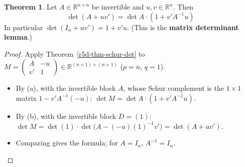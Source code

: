 \documentclass[12pt]{article}
\newcommand{\R}{\mathbb R}
\theoremstyle{definition}
\newtheorem{theorem}{Theorem}
\begin{document}
\begin{theorem}\label{r5d-thm-det-lemma}
Let \(A\in\R^{n\times n}\) be invertible and \(u,v\in\R^n\). Then
\[
\det(A+uv')=\det A\cdot(1+v'A^{-1}u)
\]
In particular \(\det(I_n+uv')=1+v'u\). (This is the \textbf{matrix determinant lemma}.)
\end{theorem}
\begin{proof}
Apply Theorem~\ref{r5d-thm-schur-det} to
\(M=\left(\begin{smallmatrix}A&-u\\v'&1\end{smallmatrix}\right)\in\R^{(n+1)\times(n+1)}\) (\(p=n\), \(q=1\)).
\begin{itemize}
\item By (a), with the invertible block \(A\), whose Schur complement is the \(1\times1\) matrix
\(1-v'A^{-1}(-u)\): \(\det M=\det A\cdot(1+v'A^{-1}u)\).
\item By (b), with the invertible block \(D=(1)\): \(\det M=\det(1)\cdot\det\bigl(A-(-u)(1)^{-1}v'\bigr)=\det(A+uv')\).
\item Comparing gives the formula; for \(A=I_n\), \(A^{-1}=I_n\).\qedhere
\end{itemize}
\end{proof}
\end{document}
